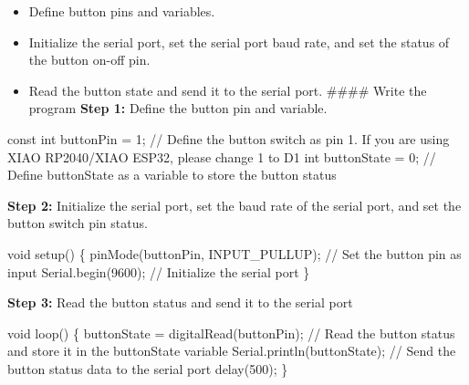 \documentclass[
  letterpaper,
  DIV=11,
  numbers=noendperiod]{scrreprt}
\newenvironment{Shaded}{\begin{snugshade}}{\end{snugshade}}
\newcommand{\AttributeTok}[1]{\textcolor[rgb]{0.40,0.45,0.13}{#1}}
\newcommand{\CommentTok}[1]{\textcolor[rgb]{0.37,0.37,0.37}{#1}}
\newcommand{\DataTypeTok}[1]{\textcolor[rgb]{0.68,0.00,0.00}{#1}}
\newcommand{\DecValTok}[1]{\textcolor[rgb]{0.68,0.00,0.00}{#1}}
\newcommand{\NormalTok}[1]{\textcolor[rgb]{0.00,0.23,0.31}{#1}}
\newcommand{\OperatorTok}[1]{\textcolor[rgb]{0.37,0.37,0.37}{#1}}
\providecommand{\tightlist}{%
  \setlength{\itemsep}{0pt}\setlength{\parskip}{0pt}}\usepackage{longtable,booktabs,array}
\begin{document}
\begin{itemize}
\tightlist
\item
  Define button pins and variables.
\item
  Initialize the serial port, set the serial port baud rate, and set the
  status of the button on-off pin.
\item
  Read the button state and send it to the serial port. \#\#\#\# Write
  the program \textbf{Step 1:} Define the button pin and variable.
\end{itemize}

\begin{Shaded}
\begin{Highlighting}[]
\AttributeTok{const} \DataTypeTok{int}\NormalTok{ buttonPin }\OperatorTok{=} \DecValTok{1}\OperatorTok{;} \CommentTok{// Define the button switch as pin 1. If you are using XIAO RP2040/XIAO ESP32, please change 1 to D1}
\DataTypeTok{int}\NormalTok{ buttonState }\OperatorTok{=} \DecValTok{0}\OperatorTok{;} \CommentTok{// Define buttonState as a variable to store the button status}
\end{Highlighting}
\end{Shaded}

\textbf{Step 2:} Initialize the serial port, set the baud rate of the
serial port, and set the button switch pin status.

\begin{Shaded}
\begin{Highlighting}[]
\DataTypeTok{void}\NormalTok{ setup}\OperatorTok{()} \OperatorTok{\{}
\NormalTok{    pinMode}\OperatorTok{(}\NormalTok{buttonPin}\OperatorTok{,}\NormalTok{ INPUT\_PULLUP}\OperatorTok{);}  \CommentTok{// Set the button pin as input}
\NormalTok{    Serial}\OperatorTok{.}\NormalTok{begin}\OperatorTok{(}\DecValTok{9600}\OperatorTok{);} \CommentTok{// Initialize the serial port}
\OperatorTok{\}}
\end{Highlighting}
\end{Shaded}

\textbf{Step 3:} Read the button status and send it to the serial port

\begin{Shaded}
\begin{Highlighting}[]
\DataTypeTok{void}\NormalTok{ loop}\OperatorTok{()} \OperatorTok{\{}
\NormalTok{    buttonState }\OperatorTok{=}\NormalTok{ digitalRead}\OperatorTok{(}\NormalTok{buttonPin}\OperatorTok{);}  \CommentTok{// Read the button status and store it in the buttonState variable}
\NormalTok{    Serial}\OperatorTok{.}\NormalTok{println}\OperatorTok{(}\NormalTok{buttonState}\OperatorTok{);} \CommentTok{// Send the button status data to the serial port}
\NormalTok{    delay}\OperatorTok{(}\DecValTok{500}\OperatorTok{);}
\OperatorTok{\}}
\end{Highlighting}
\end{Shaded}
\end{document}
